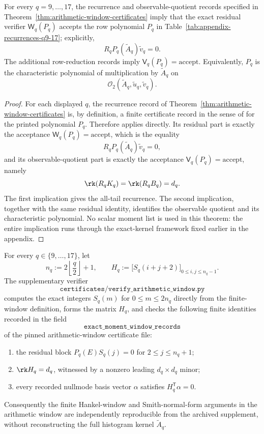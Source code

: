 \begin{theorem}
\label{prop:observable-quotient-derivation}
For every \(q=9,\dots,17\), the recurrence and observable-quotient records
specified in Theorem~\ref{thm:arithmetic-window-certificates} imply that the
exact residual verifier
\(\mathsf W_q(P_q)\) accepts the row polynomial \(P_q\) in
Table~\ref{tab:appendix-recurrences-q9-17}; explicitly,
\[
  R_qP_q(\widetilde A_q)\widetilde v_q=0.
\]
The additional row-reduction records imply
\(\mathsf V_q(P_q)=\mathrm{accept}\).  Equivalently, \(P_q\) is the
characteristic polynomial of multiplication by \(\widetilde A_q\) on
\[
  \mathcal O_2(\widetilde A_q,\widetilde u_q,\widetilde v_q).
\]
\end{theorem}

\begin{proof}
For each displayed \(q\), the recurrence record of
Theorem~\ref{thm:arithmetic-window-certificates} is, by definition, a finite
certificate record in the sense of
 for the printed polynomial
\(P_q\).  Therefore  applies
directly.  Its residual part is exactly the acceptance
\(\mathsf W_q(P_q)=\mathrm{accept}\), which is the equality
\[
  R_qP_q(\widetilde A_q)\widetilde v_q=0,
\]
and its observable-quotient part is exactly the acceptance
\(\mathsf V_q(P_q)=\mathrm{accept}\), namely
\[
  \rk(R_qK_q)=\rk(R_qB_q)=d_q.
\]
The first implication gives the all-tail recurrence.  The second implication,
together with the same residual identity, identifies the observable quotient and
its characteristic polynomial.  No scalar moment list is used in this theorem:
the entire implication runs through the exact-kernel framework fixed earlier in
the appendix.
\end{proof}

\begin{proposition}
\label{prop:exact-moment-window-supplement}
For every \(q\in\{9,\dots,17\}\), let
\[
  n_q:=2\left\lfloor\frac{q}{2}\right\rfloor+1,
  \qquad
  H_q:=\bigl[S_q(i+j+2)\bigr]_{0\le i,j\le n_q-1}.
\]
The supplementary verifier
\[
\texttt{certificates/verify\_arithmetic\_window.py}
\]
computes the exact integers \(S_q(m)\) for \(0\le m\le 2n_q\) directly from
the finite-window definition, forms the matrix \(H_q\), and checks the
following finite identities recorded in the field
\[
\texttt{exact\_moment\_window\_records}
\]
of the pinned arithmetic-window certificate file:
\begin{enumerate}
\item the residual block \(P_q(E)S_q(j)=0\) for \(2\le j\le n_q+1\);
\item \(\rk H_q=d_q\), witnessed by a nonzero leading \(d_q\times d_q\) minor;
\item every recorded nullmode basis vector \(\alpha\) satisfies
\(H_q^{\mathsf T}\alpha=0\).
\end{enumerate}
Consequently the finite Hankel-window and Smith-normal-form arguments in the
arithmetic window are independently reproducible from the archived supplement,
without reconstructing the full histogram kernel \(\widetilde A_q\).
\end{proposition}

